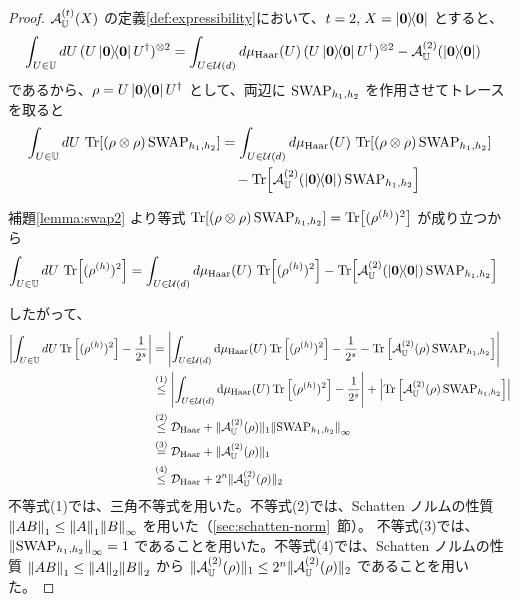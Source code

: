 \begin{proof}
    $\mathcal{A}_{\mathbb{U}}^{(t)}(X)$ の定義\ref{def:expressibility}において、$t=2,\,X = \dyad{\bs{0}}$ とすると、
    \begin{align}
        \int_{U\in\bbU} dU\,(U\dyad{\bs{0}}U\dg)\otn{2} &= \int_{U\in\calU(d)} d\mu_{\Haar}(U)\,(U\dyad{\bs{0}}U\dg)\otn{2} - \calA_{\bbU}^{(2)}(\dyad{\bs{0}})
    \end{align}
    であるから、$\rho = U\dyad{\bs{0}}U\dg$ として、両辺に $\mathrm{SWAP}_{h_1, h_2}$ を作用させてトレースを取ると
    \begin{align}
        \int_{U\in\bbU} dU\,\Tr[(\rho \ot \rho)\,\SWAP_{h_1, h_2}]
        &= \int_{U\in\calU(d)} d\mu_{\Haar}(U)\,\Tr[(\rho \ot \rho)\,\SWAP_{h_1, h_2}] \nonumber\\
        &\quad - \Tr[\calA_{\bbU}^{(2)}(\dyad{\bs{0}})\,\SWAP_{h_1, h_2}]
    \end{align}
    
    補題\ref{lemma:swap2} より等式 $\Tr[(\rho \otimes \rho)\,\mathrm{SWAP}_{h_1, h_2}] = \Tr[(\rho^{({h})})^2]$ が成り立つから 
    \begin{align}
        \int_{U\in\bbU} dU\,\Tr[(\rho^{({h})})^2]
        &= \int_{U\in\calU(d)} d\mu_{\Haar}(U)\,\Tr[(\rho^{({h})})^2] - \Tr[\calA_{\bbU}^{(2)}(\dyad{\bs{0}})\,\SWAP_{h_1, h_2}]
    \end{align}
    
    したがって、
    \begin{align}
        \abs{
            \int_{U\in\mathbb{U}} dU \Tr\qty[(\rho^{({h})})^2] - \frac{1}{2^s}
        }
        &= \abs{
            \int_{U\in\mathcal{U}(d)}\mathrm{d}\mu_{\mathrm{Haar}}(U)
            \Tr\qty[(\rho^{(h)})^2] -\frac{1}{2^s}
            - \Tr\qty[\mathcal{A}^{(2)}_{\mathbb{U}}(\rho)\,\mathrm{SWAP}_{h_1,h_2}]
        }\\
        &\overset{(1)}{\leq} \abs{
            \int_{U\in\mathcal{U}(d)}\mathrm{d}\mu_{\mathrm{Haar}}(U)
            \Tr\qty[(\rho^{(h)})^2] - \frac{1}{2^s}
        }
        + \abs{
            \Tr\qty[\mathcal{A}_{\mathbb{U}}^{(2)}(\rho)\,\mathrm{SWAP}_{h_1,h_2}]
        }\\
        &\overset{(2)}{\leq} \mathcal{D}_{\mathrm{Haar}} + \|\mathcal{A}_{\mathbb{U}}^{(2)}(\rho)\|_1 \norm{\mathrm{SWAP}_{h_1,h_2}}_{\infty}\\
        &\overset{(3)}{=} \mathcal{D}_{\mathrm{Haar}} + \|\mathcal{A}_{\mathbb{U}}^{(2)}(\rho)\|_1\\
        &\overset{(4)}{\leq} \mathcal{D}_{\mathrm{Haar}} + 2^n\|\mathcal{A}_{\mathbb{U}}^{(2)}(\rho)\|_2
    \end{align}
    不等式(1)では、三角不等式を用いた。不等式(2)では、Schatten ノルムの性質 $\norm{AB}_1 \leq \norm{A}_1 \norm{B}_\infty$ を用いた（\ref{sec:schatten-norm}~節）。
    不等式(3)では、$\norm{\mathrm{SWAP}_{h_1,h_2}}_{\infty} = 1$ であることを用いた。不等式(4)では、Schatten ノルムの性質 $\norm{AB}_1 \leq \norm{A}_2 \norm{B}_2$ から $\|\mathcal{A}_{\mathbb{U}}^{(2)}(\rho)\|_1 \leq 2^n\|\mathcal{A}_{\mathbb{U}}^{(2)}(\rho)\|_2$ であることを用いた。
\end{proof}


